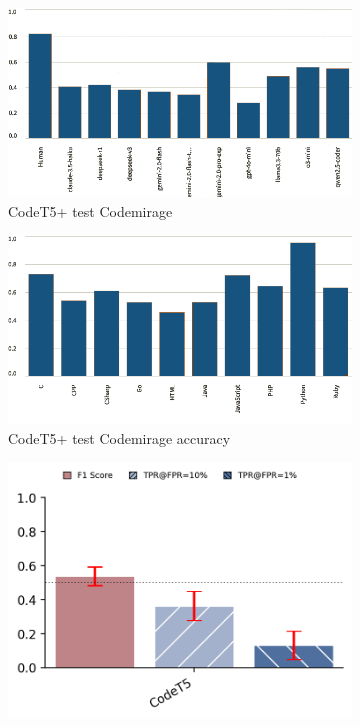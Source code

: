 \begin{figure}[H]
    \centering
    \begin{subfigure}[t]{0.35\textwidth}
        \centering
        \includegraphics[width=\linewidth]{img/TEST/CodeT5/visualization(37).png}
        \caption{CodeT5+ test Codemirage}
        \label{fig:2}
    \end{subfigure}
    \hfill
    \begin{subfigure}[t]{0.35\textwidth}
        \centering
        \includegraphics[width=\linewidth]{img/TEST/CodeT5/visualization(38).png}
        \caption{CodeT5+ test Codemirage accuracy}
        \label{fig:ab2}
    \end{subfigure}
    \hfill
    \begin{subfigure}[t]{0.4\textwidth}
        \centering
        \includegraphics[width=\linewidth]{img/TEST/CodeT5/oioi.png}

\end{subfigure}
\end{figure}
